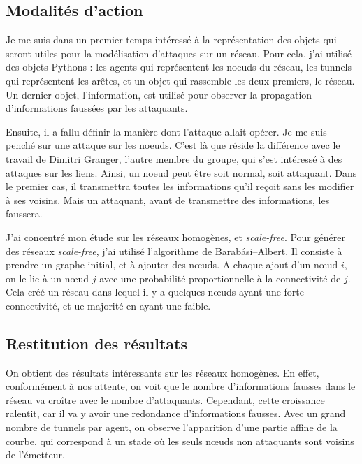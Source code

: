 \documentclass[11pt,a4paper]{article}
\begin{document}
\subsection{Modalités d'action}


Je me suis dans un premier temps intéressé à la représentation des objets qui seront utiles pour la modélisation d'attaques sur un réseau.  Pour cela, j'ai utilisé des objets Pythons : les agents qui représentent les noeuds du réseau, les tunnels qui représentent les arêtes, et un objet qui rassemble les deux premiers, le réseau. Un dernier objet, l'information, est utilisé pour observer la propagation d'informations faussées par les attaquants.

Ensuite, il a fallu définir la manière dont l'attaque allait opérer. Je me suis penché sur une attaque sur les noeuds. C'est là que réside la différence avec le travail de Dimitri Granger, l'autre membre du groupe, qui s'est intéressé à des attaques sur les liens. Ainsi, un noeud peut être soit normal, soit attaquant. Dans le premier cas, il transmettra toutes les informations qu'il reçoit sans les modifier à ses voisins. Mais un attaquant, avant de transmettre des informations, les faussera. 
	
\begin{center}
\end{center} 

	J'ai concentré mon étude sur les réseaux homogènes, et \emph{scale-free}. Pour générer des réseaux \emph{scale-free}, j'ai utilisé l'algorithme de Barabási–Albert. Il consiste à prendre un graphe initial, et à ajouter des nœuds. A chaque ajout d'un nœud $i$, on le lie à un nœud $j$ avec une probabilité proportionnelle à la connectivité de $j$. Cela créé un réseau dans lequel il y a quelques nœuds ayant une forte connectivité, et ue majorité en ayant une faible.
	
	
\subsection{Restitution des résultats}
	On obtient des résultats intéressants sur les réseaux homogènes. En effet, conformément à nos attente, on voit que le nombre d'informations fausses dans le réseau va croître avec le nombre d'attaquants. Cependant, cette croissance ralentit, car il va y avoir une redondance d'informations fausses. Avec un grand nombre de tunnels par agent, on observe l'apparition d'une partie affine de la courbe, qui correspond à un stade où les seuls nœuds non attaquants sont voisins de l'émetteur.
	
\end{document}
